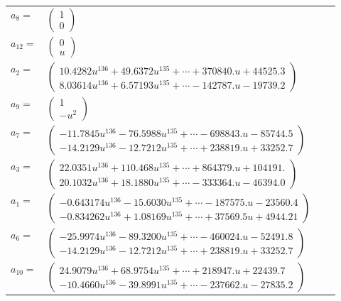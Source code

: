 \documentclass[1p]{elsarticle_modified}
\theoremstyle{definition}
\begin{document}
\begin{tabular}{m{7pt} m{180pt} m{7pt} m{180pt} }
\flushright $a_{8}=$&$\begin{pmatrix}1\\0\end{pmatrix}$ \\
\flushright $a_{12}=$&$\begin{pmatrix}0\\u\end{pmatrix}$ \\
\flushright $a_{2}=$&$\begin{pmatrix}10.4282 u^{136}+49.6372 u^{135}+\cdots+370840. u+44525.3\\8.03614 u^{136}+6.57193 u^{135}+\cdots-142787. u-19739.2\end{pmatrix}$ \\
\flushright $a_{9}=$&$\begin{pmatrix}1\\- u^2\end{pmatrix}$ \\
\flushright $a_{7}=$&$\begin{pmatrix}-11.7845 u^{136}-76.5988 u^{135}+\cdots-698843. u-85744.5\\-14.2129 u^{136}-12.7212 u^{135}+\cdots+238819. u+33252.7\end{pmatrix}$ \\
\flushright $a_{3}=$&$\begin{pmatrix}22.0351 u^{136}+110.468 u^{135}+\cdots+864379. u+104191.\\20.1032 u^{136}+18.1880 u^{135}+\cdots-333364. u-46394.0\end{pmatrix}$ \\
\flushright $a_{1}=$&$\begin{pmatrix}-0.643174 u^{136}-15.6030 u^{135}+\cdots-187575. u-23560.4\\-0.834262 u^{136}+1.08169 u^{135}+\cdots+37569.5 u+4944.21\end{pmatrix}$ \\
\flushright $a_{6}=$&$\begin{pmatrix}-25.9974 u^{136}-89.3200 u^{135}+\cdots-460024. u-52491.8\\-14.2129 u^{136}-12.7212 u^{135}+\cdots+238819. u+33252.7\end{pmatrix}$ \\
\flushright $a_{10}=$&$\begin{pmatrix}24.9079 u^{136}+68.9754 u^{135}+\cdots+218947. u+22439.7\\-10.4660 u^{136}-39.8991 u^{135}+\cdots-237662. u-27835.2\end{pmatrix}$ \\

\end{tabular}
\end{document}

